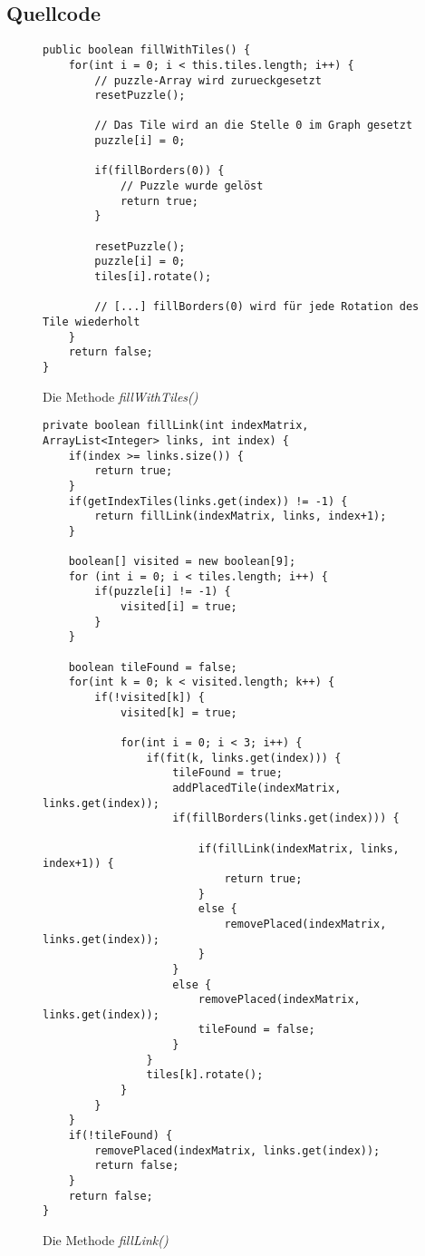 \documentclass[a4paper, 12pt]{scrartcl}
\begin{document}
\subsection{Quellcode}

\begin{figure}[H]
    \centering
\begin{lstlisting}
public boolean fillWithTiles() {
	for(int i = 0; i < this.tiles.length; i++) {
		// puzzle-Array wird zurueckgesetzt
		resetPuzzle();

        // Das Tile wird an die Stelle 0 im Graph gesetzt
        puzzle[i] = 0;
		
        if(fillBorders(0)) {
            // Puzzle wurde gelöst
            return true;
        }

        resetPuzzle();
        puzzle[i] = 0;
        tiles[i].rotate();

        // [...] fillBorders(0) wird für jede Rotation des Tile wiederholt
    }
	return false;
}
\end{lstlisting}
    \caption{Die Methode \emph{fillWithTiles()}}
\end{figure}

\begin{figure}[H]
    \centering
    \begin{lstlisting}
private boolean fillLink(int indexMatrix, ArrayList<Integer> links, int index) {
    if(index >= links.size()) {
        return true;
    }
    if(getIndexTiles(links.get(index)) != -1) {
        return fillLink(indexMatrix, links, index+1);
    }
    
    boolean[] visited = new boolean[9];
    for (int i = 0; i < tiles.length; i++) {
        if(puzzle[i] != -1) {
            visited[i] = true;
        }
    }
        
    boolean tileFound = false;
    for(int k = 0; k < visited.length; k++) {
        if(!visited[k]) {
            visited[k] = true;
            
            for(int i = 0; i < 3; i++) {
                if(fit(k, links.get(index))) {
                    tileFound = true;
                    addPlacedTile(indexMatrix, links.get(index));
                    if(fillBorders(links.get(index))) {
                        
                        if(fillLink(indexMatrix, links, index+1)) {
                            return true;
                        }
                        else {
                            removePlaced(indexMatrix, links.get(index));
                        }
                    }
                    else {
                        removePlaced(indexMatrix, links.get(index));
                        tileFound = false;
                    }
                }
                tiles[k].rotate();
            }
        }
    }
    if(!tileFound) {
        removePlaced(indexMatrix, links.get(index));
        return false;
    }
    return false;
}
    \end{lstlisting}
    \caption{Die Methode \emph{fillLink()}}
\end{figure}
\end{document}
